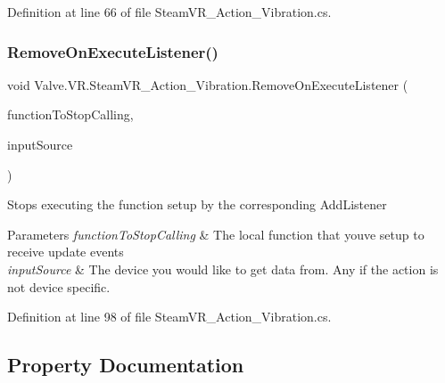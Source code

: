 Definition at line 66 of file Steam\+V\+R\+\_\+\+Action\+\_\+\+Vibration.\+cs.

\mbox{\label{class_valve_1_1_v_r_1_1_steam_v_r___action___vibration_a93047e7c0b65262fdab01a25dae48d52}} 
\subsubsection{\texorpdfstring{RemoveOnExecuteListener()}{RemoveOnExecuteListener()}}
{\footnotesize\ttfamily void Valve.\+V\+R.\+Steam\+V\+R\+\_\+\+Action\+\_\+\+Vibration.\+Remove\+On\+Execute\+Listener (\begin{DoxyParamCaption}\item[{\mbox{\hyperlink{class_valve_1_1_v_r_1_1_steam_v_r___action___vibration_ac075e9e8f3e9eea89be32c403e6f86d5}{Execute\+Handler}}}]{function\+To\+Stop\+Calling,  }\item[{\mbox{\hyperlink{namespace_valve_1_1_v_r_a82e5bf501cc3aa155444ee3f0662853f}{Steam\+V\+R\+\_\+\+Input\+\_\+\+Sources}}}]{input\+Source }\end{DoxyParamCaption})}



Stops executing the function setup by the corresponding Add\+Listener 


\begin{DoxyParams}{Parameters}
{\em function\+To\+Stop\+Calling} & The local function that you\textquotesingle{}ve setup to receive update events\\
\hline
{\em input\+Source} & The device you would like to get data from. Any if the action is not device specific.\\
\hline
\end{DoxyParams}


Definition at line 98 of file Steam\+V\+R\+\_\+\+Action\+\_\+\+Vibration.\+cs.



\subsection{Property Documentation}
\mbox{\label{class_valve_1_1_v_r_1_1_steam_v_r___action___vibration_a7a363819140be9e1483eb47fa145255f}} 
